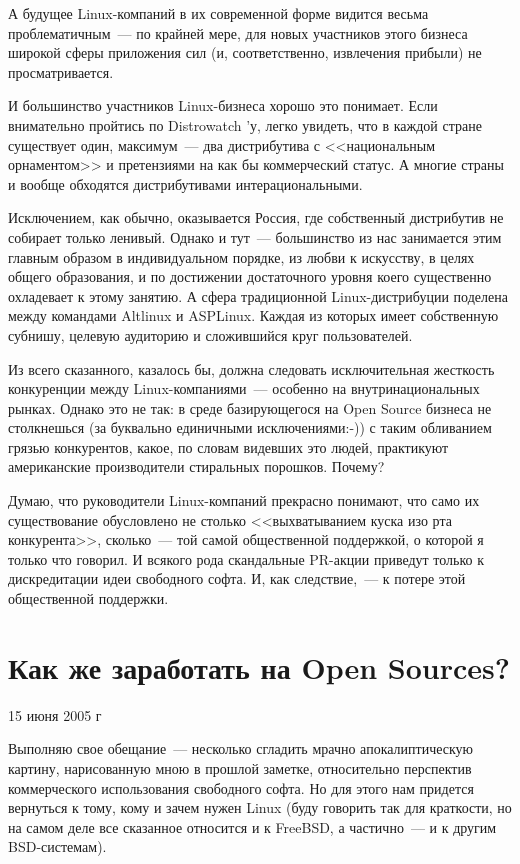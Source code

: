 А будущее Linux-компаний в их современной форме видится весьма проблематичным~--- по крайней мере, для новых участников этого бизнеса широкой сферы приложения сил (и, соответственно, извлечения прибыли) не просматривается.

И большинство участников Linux-бизнеса хорошо это понимает. Если внимательно пройтись по Distrowatch 'у, легко увидеть, что в каждой стране существует один, максимум~--- два дистрибутива с <<национальным орнаментом>> и претензиями на как бы коммерческий статус. А многие страны и вообще обходятся дистрибутивами интерациональными.

Исключением, как обычно, оказывается Россия, где собственный дистрибутив не собирает только ленивый. Однако и тут~--- большинство из нас занимается этим главным образом в индивидуальном порядке, из любви к искусству, в целях общего образования, и по достижении достаточного уровня коего существенно охладевает к этому занятию. А сфера традиционной Linux-дистрибуции поделена между командами Altlinux и ASPLinux. Каждая из которых имеет собственную субнишу, целевую аудиторию и сложившийся круг пользователей.

Из всего сказанного, казалось бы, должна следовать исключительная жесткость конкуренции между Linux-компаниями~--- особенно на внутринациональных рынках. Однако это не так: в среде базирующегося на Open Source бизнеса не столкнешься (за буквально единичными исключениями:-)) с таким обливанием грязью конкурентов, какое, по словам видевших это людей, практикуют американские производители стиральных порошков. Почему?

Думаю, что руководители Linux-компаний прекрасно понимают, что само их существование обусловлено не столько <<выхватыванием куска изо рта конкурента>>, сколько~--- той самой общественной поддержкой, о которой я только что говорил. И всякого рода скандальные PR-акции приведут только к дискредитации идеи свободного софта. И, как следствие,~--- к потере этой общественной поддержки.

\section{Как же заработать на Open Sources?} 
\begin{timeline}15 июня 2005 г\end{timeline}

Выполняю свое обещание~--- несколько сгладить мрачно апокалиптическую картину, нарисованную мною в прошлой заметке, относительно перспектив коммерческого использования свободного софта. Но для этого нам придется вернуться к тому, кому и зачем нужен Linux (буду говорить так для краткости, но на самом деле все сказанное относится и к FreeBSD, а частично~--- и к другим BSD-системам).

